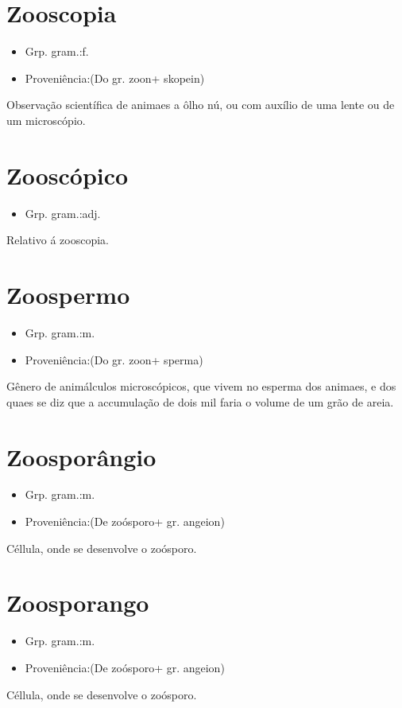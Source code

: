 \section{Zooscopia}
\begin{itemize}
\item {Grp. gram.:f.}
\end{itemize}
\begin{itemize}
\item {Proveniência:(Do gr. \textunderscore zoon\textunderscore  + \textunderscore skopein\textunderscore )}
\end{itemize}
Observação scientífica de animaes a ôlho nú, ou com auxílio de uma lente ou de um microscópio.
\section{Zooscópico}
\begin{itemize}
\item {Grp. gram.:adj.}
\end{itemize}
Relativo á zooscopia.
\section{Zoospermo}
\begin{itemize}
\item {Grp. gram.:m.}
\end{itemize}
\begin{itemize}
\item {Proveniência:(Do gr. \textunderscore zoon\textunderscore  + \textunderscore sperma\textunderscore )}
\end{itemize}
Gênero de animálculos microscópicos, que vivem no esperma dos animaes, e dos quaes se diz que a accumulação de dois mil faria o volume de um grão de areia.
\section{Zoosporângio}
\begin{itemize}
\item {Grp. gram.:m.}
\end{itemize}
\begin{itemize}
\item {Proveniência:(De \textunderscore zoósporo\textunderscore  + gr. \textunderscore angeion\textunderscore )}
\end{itemize}
Céllula, onde se desenvolve o zoósporo.
\section{Zoosporango}
\begin{itemize}
\item {Grp. gram.:m.}
\end{itemize}
\begin{itemize}
\item {Proveniência:(De \textunderscore zoósporo\textunderscore  + gr. \textunderscore angeion\textunderscore )}
\end{itemize}
Céllula, onde se desenvolve o zoósporo.
